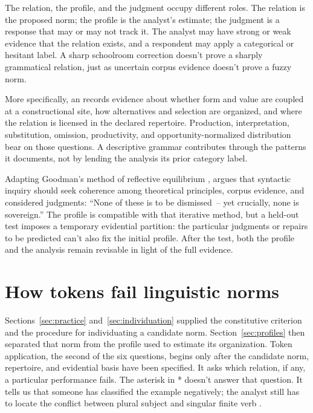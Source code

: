 \documentclass[12pt,letterpaper]{article}
\begin{document}
The relation, the profile, and the judgment occupy different roles. The relation
is the proposed norm; the profile is the analyst's estimate; the judgment is a
response that may or may not track it. The analyst may have strong or weak evidence
that the relation exists, and a respondent may apply a categorical or hesitant
label. A sharp schoolroom correction doesn't prove a sharply grammatical relation,
just as uncertain corpus evidence doesn't prove a fuzzy norm.

More specifically, an  records evidence about whether form
and value are coupled at a constructional
site, how alternatives and selection are organized, and where the relation is
licensed in the declared repertoire. Production, interpretation, substitution,
omission, productivity, and opportunity-normalized distribution bear on those
questions. A descriptive grammar contributes through the patterns it documents,
not by lending the analysis its prior category label.

Adapting Goodman's method of reflective equilibrium \citep[64]{Goodman1955},
\textcite[296]{pullum2017} argues that syntactic inquiry should seek coherence
among theoretical principles, corpus evidence, and considered judgments:
\enquote{None of these is to be
dismissed~-- yet crucially, none is sovereign.} The profile is compatible with that
iterative method, but a held-out test imposes a temporary evidential partition:
the particular judgments or repairs to be predicted can't also fix the initial
profile. After the test, both the profile and the analysis remain revisable in
light of the full evidence.


\section{How tokens fail linguistic norms}
\label{sec:failure}

Sections~\ref{sec:practice} and~\ref{sec:individuation} supplied the constitutive
criterion and the procedure for individuating a candidate norm.
Section~\ref{sec:profiles} then separated that norm from the profile used to
estimate its organization. Token application, the second of the six questions,
begins only after the candidate norm, repertoire, and evidential basis have been
specified. It asks which relation, if any, a
particular performance fails. The asterisk in *
doesn't answer that question. It tells us that someone has classified the example
negatively; the analyst still has to locate the conflict between plural subject and
singular finite verb \citep[84, 237]{huddleston2002}.
\end{document}
